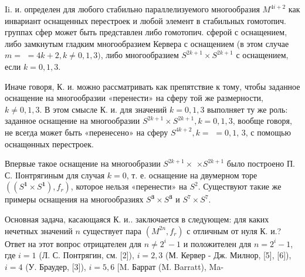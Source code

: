 \documentclass[10pt]{article}
\begin{document}
Ii. и. определен для любого стабильно параллелизуемого многообразия $M^{4 i+2}$ как инвариант оснащенных перестроек и любой элемент в стабильных гомотопич. группах сфер может быть представлен либо гомотопич. сферой с оснащением, либо замкнутым гладким многообразием Кервера с оснащением (в этом случае $m=$ $=4 k+2, k \neq 0,1,3)$, либо многообразием $S^{2 k+1} \times S^{2 k+1}$ с оснащением, если $k=0,1,3$.



Иначе говоря, К. и. можно рассматривать как препятствие к тому, чтобы заданное оснащение на многообразии «перенести» на сферу той же размерности, $k \neq 0,1,3$. В этом смысле К. и. для значений $k=0,1,3$ выполняет ту же роль: заданное оснащение на многообразии $S^{2 k+1} \times S^{2 k+1}, k=0,1,3$, вообще говоря, не всегда может быть «перенесено» на сферу $S^{4 k+2}, k=$ $=0,1$, 3, с помощью оснащөнных перестроек.



Впервые такое оснащение на многообразии $S^{2 k+1} \times$ $\times S^{2 k+1}$ было построено П. С. ІІонтрягиным для случая $k=0$, т. е. оснащение на двумерном торе $\left(\left(S^{\mathbf{1}} \times S^{\mathbf{1}}\right), f_{r}\right)$, которое нельзя «перенести» на $S^{2}$. Существуют такие же примеры оснащения на многообразиях $S^{\mathbf{3}} \times S^{\mathbf{3}}$ и $S^{7} \times S^{7}$.



Основная задача, касающаяся К. и.. заключается в следующем: для каких нечетных значений $n$ существует пара $\left(M^{2 n}, f_{r}\right)$ с отличным от нуля К. и.? Ответ на этот вопрос отрицателен для $n \neq 2^{i}-1$ и положителен для $n=2^{i}-1$, где $i=1$ (Л. С. Понтрягин, см. [2]), $i=2,3$ (М. Кервер - Дж. Милнор, [5], [6]), $i=4$ (У. Браудер, [3]), $i=5,6$ [M. Баррат (M. Barratt), Ma-
\end{document}

